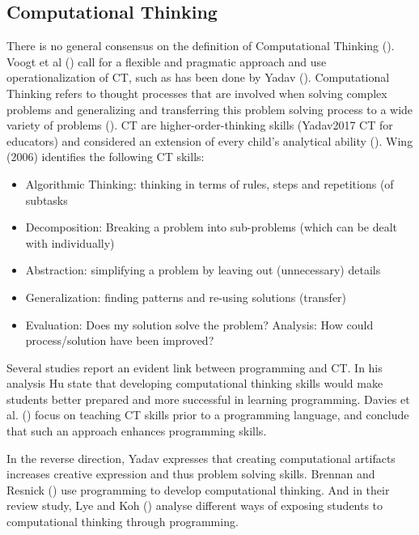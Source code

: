 \subsection{Computational Thinking}

There is no general consensus on the definition of Computational Thinking (\cite{Yadav2015}). Voogt et al (\cite{voogt2015computational}) call for a flexible and pragmatic approach and use operationalization of CT, such as has been done by Yadav (\cite{Yadav2015}). Computational Thinking refers to thought processes that are involved when solving complex problems and generalizing and transferring this problem solving process to a wide variety of problems (\cite{voogt2015computational}). CT are higher-order-thinking skills  (Yadav2017 CT for educators) and considered an extension of every child's analytical ability (\cite{Wing2006}). Wing (2006) identifies the following CT skills:\label{CTdefWing}
\begin{itemize}
\item Algorithmic Thinking: thinking in terms of rules, steps and repetitions (of subtasks
\item Decomposition: Breaking a problem into sub-problems (which can be dealt with individually)
\item Abstraction: simplifying a problem by leaving out (unnecessary) details
\item Generalization: finding patterns and re-using solutions (transfer)
\item Evaluation: Does my solution solve the problem? Analysis: How could process/solution have been improved?
\end{itemize}





Several studies report an evident link between programming and CT. In his analysis Hu \cite{hu2011computational} state that developing computational thinking skills would make students better prepared and more successful in learning programming. Davies et al. (\cite{davies2008effects}) focus on teaching CT skills prior to a programming language, and conclude that such an approach enhances programming skills.

In the reverse direction, Yadav \cite{Yadav2017CTteacherEd} expresses that creating computational artifacts increases creative expression and thus problem solving skills. Brennan and Resnick (\cite{BrennanResnick2012}) use programming to develop computational thinking. And in their review study, Lye and Koh (\cite{LyeKoh2014}) analyse different ways of exposing students to computational thinking through programming.


